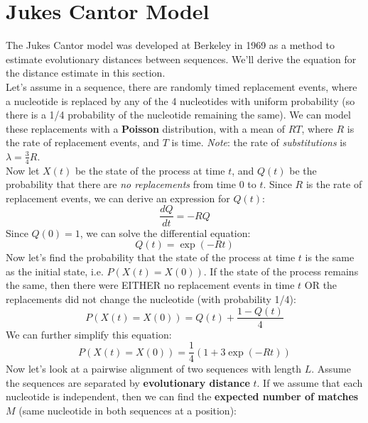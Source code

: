 \documentclass[12pt]{article}
\begin{document}
\section{Jukes Cantor Model}
The Jukes Cantor model was developed at Berkeley in 1969 as a method to estimate evolutionary distances between sequences. We'll derive the equation for the distance estimate in this section.\\[10pt]
Let's assume in a sequence, there are randomly timed replacement events, where a nucleotide is replaced by any of the 4 nucleotides with uniform probability (so there is a 1/4 probability of the nucleotide remaining the same). We can model these replacements with a \textbf{Poisson} distribution, with a mean of $RT$, where $R$ is the rate of replacement events, and $T$ is time. \textit{Note}: the rate of \textit{substitutions} is $\lambda = \frac{3}{4}R$.\\[10pt]
Now let $X(t)$ be the state of the process at time $t$, and $Q(t)$ be the probability that there are \textit{no replacements} from time $0$ to $t$. Since $R$ is the rate of replacement events, we can derive an expression for $Q(t)$:
\begin{equation}
    \frac{dQ}{dt} = -RQ
\end{equation}
Since $Q(0) = 1$, we can solve the differential equation:
\begin{equation}
    Q(t) = \exp(-Rt)
\end{equation}
Now let's find the probability that the state of the process at time $t$ is the same as the initial state, i.e. $P\left(X\left(t\right) = X\left(0\right)\right)$. If the state of the process remains the same, then there were EITHER no replacement events in time $t$ OR the replacements did not change the nucleotide (with probability 1/4):
\begin{equation}
    P\left(X\left(t\right) = X\left(0\right)\right) = Q\left(t\right) + \frac{1-Q\left(t\right)}{4}
\end{equation}
We can further simplify this equation:
\begin{equation}
    P\left(X\left(t\right) = X\left(0\right)\right) = \frac{1}{4}\left(1 + 3\exp\left(-Rt\right)\right)
\end{equation}
Now let's look at a pairwise alignment of two sequences with length $L$. Assume the sequences are separated by \textbf{evolutionary distance} $t$. If we assume that each nucleotide is independent, then we can find the \textbf{expected number of matches} $M$ (same nucleotide in both sequences at a position):
\end{document}
